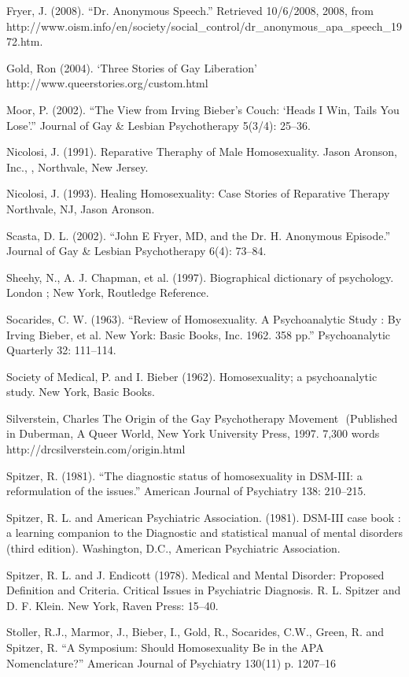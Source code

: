 Fryer, J. (2008). ``Dr. Anonymous Speech.'' Retrieved 10\slash 6\slash 2008, 2008, from http:\slash \slash www.oism.info\slash en\slash society\slash social\_control\slash dr\_anonymous\_apa\_speech\_1972.htm.

Gold, Ron (2004). ‘Three Stories of Gay Liberation’ http:\slash \slash www.queerstories.org\slash custom.html

Moor, P. (2002). ``The View from Irving Bieber's Couch: `Heads I Win, Tails You Lose'.'' Journal of Gay \& Lesbian Psychotherapy 5(3\slash 4): 25--36.

Nicolosi, J. (1991). Reparative Theraphy of Male Homosexuality. Jason Aronson, Inc., , Northvale, New Jersey.

Nicolosi, J. (1993). Healing Homosexuality: Case Stories of Reparative Therapy Northvale, NJ, Jason Aronson.

Scasta, D. L. (2002). ``John E Fryer, MD, and the Dr. H. Anonymous Episode.'' Journal of Gay \& Lesbian Psychotherapy 6(4): 73--84.

Sheehy, N., A. J. Chapman, et al. (1997). Biographical dictionary of psychology. London ; New York, Routledge Reference.

Socarides, C. W. (1963). ``Review of Homosexuality. A Psychoanalytic Study : By Irving Bieber, et al. New York: Basic Books, Inc. 1962. 358 pp.'' Psychoanalytic Quarterly 32: 111--114.

Society of Medical, P. and I. Bieber (1962). Homosexuality; a psychoanalytic study. New York, Basic Books.

Silverstein, Charles The Origin of the Gay Psychotherapy Movement
 (Published in Duberman, A Queer World, New York University Press, 1997. 7,300 words http:\slash \slash drcsilverstein.com\slash origin.html

Spitzer, R. (1981). ``The diagnostic status of homosexuality in DSM-III: a reformulation of the issues.'' American Journal of Psychiatry 138: 210--215.

Spitzer, R. L. and American Psychiatric Association. (1981). DSM-III case book : a learning companion to the Diagnostic and statistical manual of mental disorders (third edition). Washington, D.C., American Psychiatric Association.

Spitzer, R. L. and J. Endicott (1978). Medical and Mental Disorder: Proposed Definition and Criteria. Critical Issues in Psychiatric Diagnosis. R. L. Spitzer and D. F. Klein. New York, Raven Press: 15--40.

Stoller, R.J., Marmor, J., Bieber, I., Gold, R., Socarides, C.W., Green, R. and Spitzer, R. “A Symposium: Should Homosexuality Be in the APA Nomenclature?” American Journal of Psychiatry 130(11) p. 1207--16

